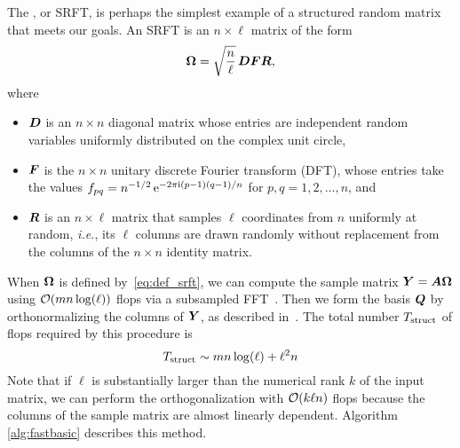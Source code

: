 \documentclass[12pt]{article}
\begin{document}
The , or SRFT, is perhaps the
simplest example of a structured random matrix that meets our goals.
An SRFT is an $n \times \ell$ matrix of the form
\begin{equation}
\label{eq:def_srft}
\bm{\Omega} = \sqrt{\frac{n}{\ell}} \, \bm{DFR},
\end{equation}
where
\lsp
\begin{itemize}
\item   $\bm{D}$ is an $n \times n$ diagonal matrix whose entries are
independent random variables uniformly distributed on the complex unit circle,

\item   $\bm{F}$ is the $n \times n$ unitary discrete Fourier transform (DFT),
whose entries take the values $f_{pq} = n^{-1/2} \, \mathrm{e}^{-2\pi\mathrm{i} (p-1)(q-1)/n}$ for $p, q = 1, 2, \dots, n$, and

\item   $\bm{R}$ is an $n \times \ell$ matrix that samples $\ell$ coordinates
from $n$ uniformly at random, \textit{i.e.}, its $\ell$ columns are drawn randomly
without replacement from the columns of the $n \times n$ identity matrix.
\end{itemize}
\lsp

When $\bm{\Omega}$ is defined by~\eqref{eq:def_srft}, we can compute the sample
matrix $\bm{Y} = \bm{A\Omega}$ using $\mathcal{O}(mn\log(\ell))$ flops via a
subsampled FFT~\cite{random2}.
Then we form the basis $\bm{Q}$ by orthonormalizing
the columns of $\bm{Y}$, as described in~\cite[\S~4.1]{RM}. %
The total number $T_{\rm struct}$ of flops required by this procedure is
\begin{equation}
\label{eq:cost_SRFT}
T_{\rm struct} \sim mn \log(\ell) + \ell^2 n
\end{equation}
%
Note that if $\ell$ is substantially larger than the numerical rank $k$
of the input matrix, we can perform the orthogonalization with $\mathcal{O}( k \ell n)$
flops because the columns of the sample matrix are almost linearly dependent.
Algorithm \ref{alg:fastbasic} describes this method.
\end{document}
